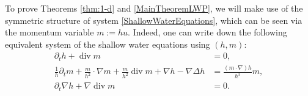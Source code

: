 \documentclass[reqno,11pt]{amsart}
\newcommand{\norm}[2]{\Vert #1 \Vert_{#2}}
\DeclareMathOperator{\Div}{div}
\theoremstyle{plain}
\newtheorem{theorem}{Theorem}[section]
\theoremstyle{definition}
\numberwithin{equation}{section}
\begin{document}
To prove Theorems \ref{thm:1-d} and \ref{MainTheoremLWP}, we will make use of the symmetric structure of system \eqref{ShallowWaterEquations}, which can be seen via the momentum variable $m:=hu.$ Indeed, one can write down the following equivalent system of the shallow water equations using $ (h,m) $: 
    \begin{subequations}
    \label{ShallowWaterMomentum}
    \begin{align}
    \label{ShallowWaterMomentumMass}
        \partial_t h+ \Div  m  & =0, \\
        \label{ShallowWaterMomentumMomentum}
        \frac{1}{h}\partial_t m +\frac{m}{h^2}\cdot\nabla m+ \frac{m}{h^2}\Div m+\nabla h-\nabla \Delta h & =\frac{(m\cdot\nabla)h}{h^3}  m, \\
        \label{ShallowWaterSurfaceGradient}
        \partial_t \nabla h+\nabla \Div m & =0.
    \end{align}
    \end{subequations}
\end{document}
